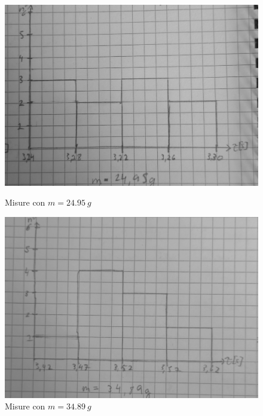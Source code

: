 \documentclass[a4paper]{article}
\begin{document}
{\begin{figure}[!htbp]
    \begin{minipage}[b]{0.45\textwidth}
        \includegraphics[width=\textwidth]{fotomolla/Molla 1/25.jpg}
        \caption{Misure con $m=\SI{24.95}{g}$}
    \end{minipage}
    \hfil
     \begin{minipage}[b]{0.45\textwidth}
        \includegraphics[width=\textwidth]{fotomolla/Molla 1/35.jpg}
        \caption{Misure con $m=\SI{34.89}{g}$}
    \end{minipage}
\end{figure}
\begin{figure}[!htbp]
    \begin{minipage}[b]{0.45\textwidth}

\end{minipage}
\end{figure}}
\end{document}
